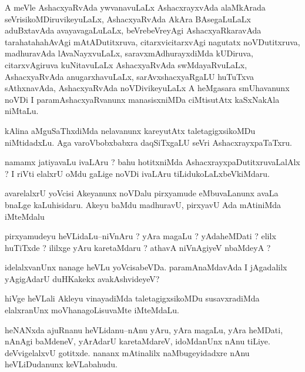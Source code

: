 \documentclass{article}
\begin{document}
\begin{mn}%
A meVle AshacxyaRvAda ywvanavuLaLx AshacxrayxvAda alaMkArada seVrisikoMDiruvikeyuLaLx, 
AshacxyaRvAda AkAra BAsegaLuLaLx aduBxtavAda avayavagaLuLaLx, beVrebeVreyAgi 
AshacxyaRkaravAda tarahatahahAvAgi mAtADutitxruva, citarxvicitarxvAgi nagutatx 
noVDutitxruva, madhuravAda lAvaNayxvuLaLx, saravxmAdhurayxdiMda kUDiruva, citarxvAgiruva 
kuNitavuLaLx AshacxyaRvAda swMdayaRvuLaLx, AshacxyaRvAda anugarxhavuLaLx, 
sarAvxshacxyaRgaLU huTuTxva sAthxnavAda, AshacxyaRvAda noVDivikeyuLaLx A heMgasara 
smUhavanunx noVDi I paramAshacxyaRvanunx manasisxniMDa ciMtisutAtx kaSxNakAla niMtaLu.
\end{mn}

\begin{mn}%
kAlina aMguSaThxdiMda nelavanunx kareyutAtx taletagigxsikoMDu niMtidadxLu. Aga 
varoVbobxbabxra daqSiTxgaLU seVri AshacxrayxpaTaTxru.
\end{mn}

\begin{mn}%
namamx jatiyavaLu ivaLAru ? bahu hotitxniMda AshacxrayxpaDutitxruvaLalAlx ? I riVti 
elalxrU oMdu gaLige noVDi ivaLAru tiLidukoLaLxbeVkiMdaru.
\end{mn}

\begin{mn}%
avarelalxrU yoVcisi Akeyanunx noVDalu pirxyamude eMbuvaLanunx avaLa bnaLge kaLuhisidaru. 
Akeyu baMdu madhuravU, pirxyavU Ada mAtiniMda iMteMdalu
\end{mn}

\begin{mn}%
pirxyamudeyu heVLidaLu--niVnAru ? yAra magaLu ? yAdaheMDati ? elilx huTiTxde ? ililxge 
yAru karetaMdaru ? athavA niVnAgiyeV nbaMdeyA ?
\end{mn}

\begin{mn}%
idelalxvanUnx nanage heVLu yoVcisabeVDa. paramAnaMdavAda I jAgadalilx yAgigAdarU duHKakekx 
avakAshvideyeV?
\end{mn}

\begin{mn}%
hiVge heVLali Akleyu vinayadiMda taletagigxsikoMDu susavxradiMda elalxranUnx 
moVhanagoLisuvaMte iMteMdaLu.
\end{mn}

\begin{mn}%
heNANxda ajuRnanu heVLidanu--nAnu yAru, yAra magaLu, yAra heMDati, nAnAgi baMdeneV, 
yArAdarU karetaMdareV, idoMdanUnx nAnu tiLiye. deVvigelalxvU gotitxde. nananx mAtinalilx 
naMbugeyidadxre nAnu heVLiDudanunx keVLabahudu.
\end{mn}
\end{document}
